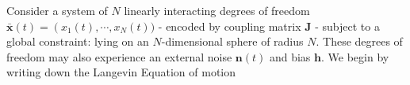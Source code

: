 Consider a system of $N$ linearly interacting degrees of freedom $\mathbf{\bar x}(t) = \left(x_1(t),\cdots, x_N(t))$ - encoded by coupling matrix $\mathbf{J}$ - subject to a global constraint: lying on an $N$-dimensional sphere of radius $N$. These degrees of freedom may also experience an external noise $\mathbf{n}(t)$ and bias $\mathbf{h}$. We begin by writing down the Langevin Equation of motion